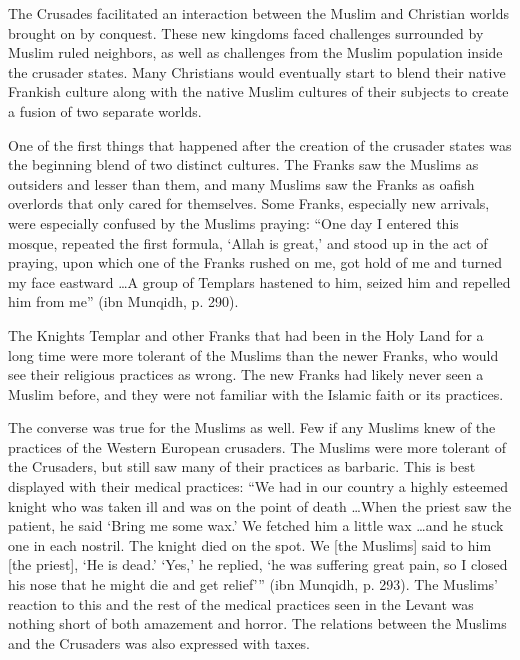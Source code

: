 \documentclass[12pt]{article}
\begin{document}
The Crusades facilitated an interaction between the Muslim and Christian worlds brought on by conquest.
These new kingdoms faced challenges surrounded by Muslim ruled neighbors, as well as challenges from the Muslim population inside the crusader states.
Many Christians would eventually start to blend their native Frankish culture along with the native Muslim cultures of their subjects to create a fusion of two separate worlds.

One of the first things that happened after the creation of the crusader states was the beginning blend of two distinct cultures.
The Franks saw the Muslims as outsiders and lesser than them, and many Muslims saw the Franks as oafish overlords that only cared for themselves.
Some Franks, especially new arrivals, were especially confused by the Muslims praying:
``One day I entered this mosque, repeated the first formula, `Allah is great,' and stood up in the act of praying, upon which one of the Franks rushed on me, got hold of me and turned my face eastward \dots A group of Templars hastened to him, seized him and repelled him from me''
(ibn Munqidh, p. 290).

The Knights Templar and other Franks that had been in the Holy Land for a long time were more tolerant of the Muslims than the newer Franks, who would see their religious practices as wrong.
The new Franks had likely never seen a Muslim before, and they were not familiar with the Islamic faith or its practices.

The converse was true for the Muslims as well.
Few if any Muslims knew of the practices of the Western European crusaders.
The Muslims were more tolerant of the Crusaders, but still saw many of their practices as barbaric.
This is best displayed with their medical practices:
``We had in our country a highly esteemed knight who was taken ill and was on the point of death \dots When the priest saw the patient, he said `Bring me some wax.' We fetched him a little wax \dots and he stuck one in each nostril. The knight died on the spot. We [the Muslims] said to him [the priest], `He is dead.' `Yes,' he replied, `he was suffering great pain, so I closed his nose that he might die and get relief''' (ibn Munqidh, p. 293).
The Muslims' reaction to this and the rest of the medical practices seen in the Levant was nothing short of both amazement and horror.
The relations between the Muslims and the Crusaders was also expressed with taxes.
\end{document}
